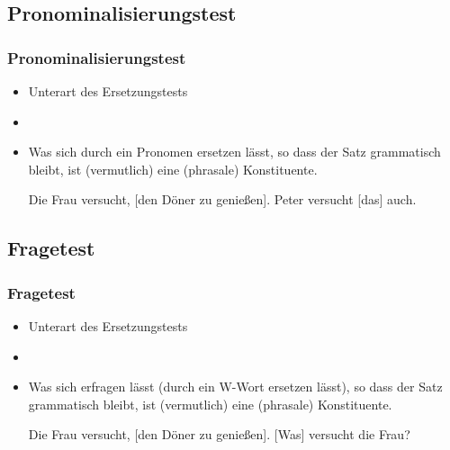 \subsection{Pronominalisierungstest}

\begin{frame}
\frametitle{Pronominalisierungstest}

\begin{itemize}
	\item Unterart des Ersetzungstests
	\item[]
	\item Was sich durch ein Pronomen ersetzen lässt, so dass der Satz grammatisch bleibt, ist (vermutlich) eine (phrasale) Konstituente.

	\eal 
	\zl

\pause	
	\eal 
	\ex Die Frau versucht, \alert{[den Döner zu genießen]}.
	\ex Peter versucht \alert{[das]} auch.
	\zl
	
\end{itemize}

\end{frame}


\subsection{Fragetest}

\begin{frame}
\frametitle{Fragetest}

\begin{itemize}
	\item Unterart des Ersetzungstests
	\item[]
	\item Was sich erfragen lässt (durch ein W-Wort ersetzen lässt), so dass der Satz grammatisch bleibt, ist (vermutlich) eine (phrasale) Konstituente.

	\eal 
	\zl

\pause	
	\eal 
	\ex Die Frau versucht, \alert{[den Döner zu genießen]}.
	\ex \alert{[Was]} versucht die Frau?
	\zl
	
\end{itemize}

\end{frame}


